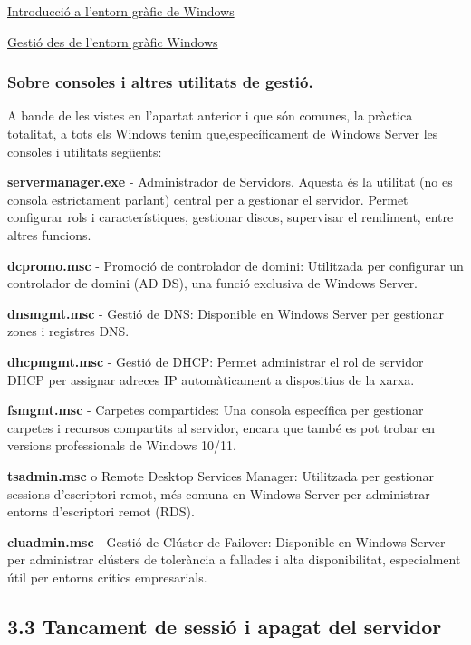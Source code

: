 \documentclass[
  a4paper,
]{article}
\begin{document}
\href{https://tofermos.github.io/Windows11/interfaces/interfaces.html}{Introducció
a l'entorn gràfic de Windows}

\href{https://tofermos.github.io/Windows11/gestiodelequip/gestiodelequip.html}{Gestió
des de l'entorn gràfic Windows}

\subsubsection{Sobre consoles i altres utilitats de
gestió.}\label{sobre-consoles-i-altres-utilitats-de-gestiuxf3.}

A bande de les vistes en l'apartat anterior i que són comunes, la
pràctica totalitat, a tots els Windows tenim que,específicament de
Windows Server les consoles i utilitats següents:

\textbf{servermanager.exe} - Administrador de Servidors. Aquesta és la
utilitat (no es consola estrictament parlant) central per a gestionar el
servidor. Permet configurar rols i característiques, gestionar discos,
supervisar el rendiment, entre altres funcions.

\textbf{dcpromo.msc} - Promoció de controlador de domini: Utilitzada per
configurar un controlador de domini (AD DS), una funció exclusiva de
Windows Server.

\textbf{dnsmgmt.msc} - Gestió de DNS: Disponible en Windows Server per
gestionar zones i registres DNS.

\textbf{dhcpmgmt.msc} - Gestió de DHCP: Permet administrar el rol de
servidor DHCP per assignar adreces IP automàticament a dispositius de la
xarxa.

\textbf{fsmgmt.msc} - Carpetes compartides: Una consola específica per
gestionar carpetes i recursos compartits al servidor, encara que també
es pot trobar en versions professionals de Windows 10/11.

\textbf{tsadmin.msc} o Remote Desktop Services Manager: Utilitzada per
gestionar sessions d'escriptori remot, més comuna en Windows Server per
administrar entorns d'escriptori remot (RDS).

\textbf{cluadmin.msc} - Gestió de Clúster de Failover: Disponible en
Windows Server per administrar clústers de tolerància a fallades i alta
disponibilitat, especialment útil per entorns crítics empresarials.

\subsection{\texorpdfstring{3.3 \textbf{Tancament de sessió i apagat del
servidor}}{3.3 Tancament de sessió i apagat del servidor}}\label{tancament-de-sessiuxf3-i-apagat-del-servidor}
\end{document}
